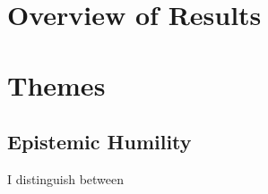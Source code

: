 


\section{}


\section{Overview of Results}
\section{Themes}
\subsection{Epistemic Humility}
I distinguish between 
